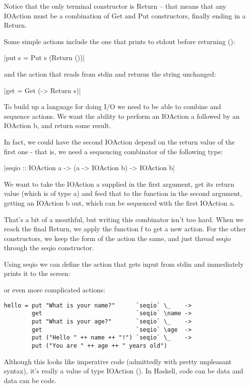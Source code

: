 \documentclass[thesis-solanki.tex]{subfiles}
\begin{document}
Notice that the only terminal constructor is Return – that means that any IOAction must be a combination of Get and Put constructors, 
finally ending in a Return.

Some simple actions include the one that prints to stdout before returning ():

|put s = Put s (Return ())|

and the action that reads from stdin and returns the string unchanged:

|get = Get (\s -> Return s)|

To build up a language for doing I/O we need to be able to combine and sequence actions. We want the ability to perform an IOAction a 
followed by an IOAction b, and return some result.

In fact, we could have the second IOAction depend on the return value of the first one - that is, we need a sequencing combinator of the 
following type:

|seqio :: IOAction a -> (a -> IOAction b) -> IOAction b|

We want to take the IOAction a supplied in the first argument, get its return value (which is of type a) and feed that to the function in 
the second argument, getting an IOAction b out, which can be sequenced with the first IOAction a.

That’s a bit of a mouthful, but writing this combinator isn’t too hard. When we reach the final Return, we apply the function f to get a 
new action. For the other constructors, we keep the form of the action the same, and just thread seqio through the seqio constructor.

Using seqio we can define the action that gets input from stdin and immediately prints it to the screen:


or even more complicated actions:
\begin{verbatim}
hello = put "What is your name?"      `seqio` \_    ->
        get                           `seqio` \name ->
        put "What is your age?"       `seqio` \_    ->
        get                           `seqio` \age  ->
        put ("Hello " ++ name ++ "!") `seqio` \_    ->
        put ("You are " ++ age ++ " years old")
\end{verbatim}
Although this looks like imperative code (admittedly with pretty unpleasant syntax), it’s really a value of type IOAction (). In Haskell, 
code can be data and data can be code.
\end{document}
